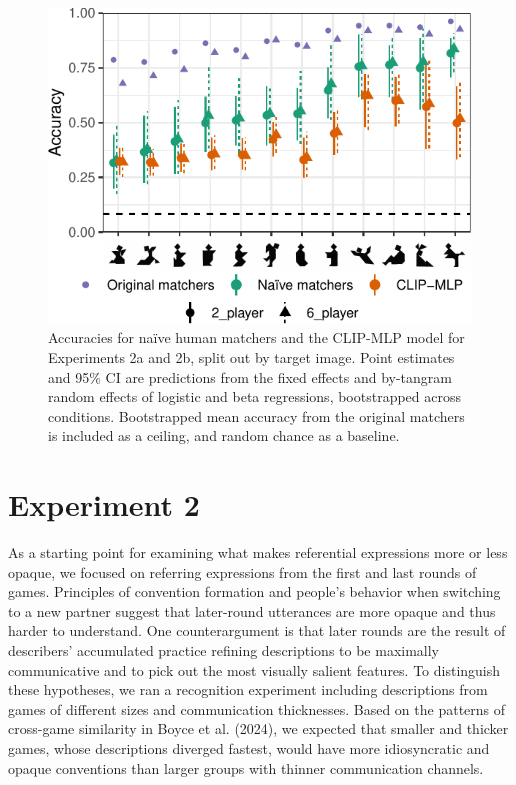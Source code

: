 \documentclass[10pt, letterpaper]{article}
\begin{document}
\begin{CodeChunk}
\begin{figure}[t]

{\centering \includegraphics[width=0.9\linewidth]{figs/fig-2-1} 

}

\caption[Accuracies for naïve human matchers and the CLIP-MLP model for Experiments 2a and 2b, split out by target image]{Accuracies for naïve human matchers and the CLIP-MLP model for Experiments 2a and 2b, split out by target image. Point estimates and 95\% CI are predictions from the fixed effects and by-tangram random effects of logistic and beta regressions, bootstrapped across conditions. Bootstrapped mean accuracy from the original matchers is included as a ceiling, and random chance as a baseline. \label{expt2-tangram}}\label{fig:fig-2}
\end{figure}
\end{CodeChunk}

\section{Experiment 2}\label{experiment-2}

As a starting point for examining what makes referential expressions
more or less opaque, we focused on referring expressions from the first
and last rounds of games. Principles of convention formation and
people's behavior when switching to a new partner suggest that
later-round utterances are more opaque and thus harder to understand.
One counterargument is that later rounds are the result of describers'
accumulated practice refining descriptions to be maximally communicative
and to pick out the most visually salient features. To distinguish these
hypotheses, we ran a recognition experiment including descriptions from
games of different sizes and communication thicknesses. Based on the
patterns of cross-game similarity in Boyce et al. (2024), we expected
that smaller and thicker games, whose descriptions diverged fastest,
would have more idiosyncratic and opaque conventions than larger groups
with thinner communication channels.
\end{document}
